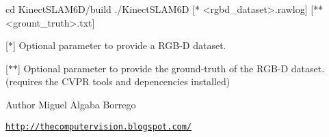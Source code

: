 \begin{DoxyVerb}
cd KinectSLAM6D/build
./KinectSLAM6D [* <rgbd_dataset>.rawlog] [** <grount_truth>.txt]
\end{DoxyVerb}
 \mbox{[}$\ast$\mbox{]} Optional parameter to provide a RGB-\/D dataset. \par
 \mbox{[}$\ast$$\ast$\mbox{]} Optional parameter to provide the ground-\/truth of the RGB-\/D dataset. (requires the CVPR tools and depencencies installed)

   \begin{DoxyAuthor}{Author}
Miguel Algaba Borrego \par
 \href{http://thecomputervision.blogspot.com/}{\tt http://thecomputervision.blogspot.com/} 
\end{DoxyAuthor}

